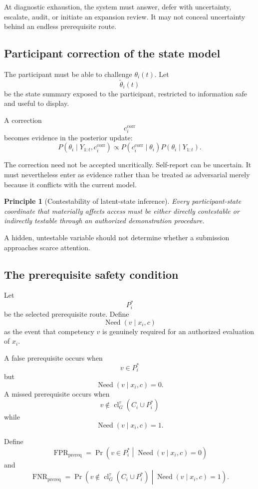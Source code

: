 \documentclass[11pt]{article}
\newtheorem{principle}[definition]{Principle}
\theoremstyle{definition}
\DeclareMathOperator{\Prob}{Pr}
\DeclareMathOperator{\closure}{cl}
\begin{document}
At diagnostic exhaustion, the system must answer, defer with uncertainty, escalate, audit, or initiate an expansion review. It may not conceal uncertainty behind an endless prerequisite route.

\subsection{Participant correction of the state model}

The participant must be able to challenge \(\theta_i(t)\). Let
\[
\widetilde\theta_i(t)
\]
be the state summary exposed to the participant, restricted to information safe and useful to display.

A correction
\[
c_i^{\mathrm{corr}}
\]
becomes evidence in the posterior update:
\[
P(\theta_i\mid Y_{1:t},c_i^{\mathrm{corr}})
\propto
P(c_i^{\mathrm{corr}}\mid\theta_i)
P(\theta_i\mid Y_{1:t}).
\]

The correction need not be accepted uncritically. Self-report can be uncertain. It must nevertheless enter as evidence rather than be treated as adversarial merely because it conflicts with the current model.

\begin{principle}[Contestability of latent-state inference]
Every participant-state coordinate that materially affects access must be either directly contestable or indirectly testable through an authorized demonstration procedure.
\end{principle}

A hidden, untestable variable should not determine whether a submission approaches scarce attention.

\subsection{The prerequisite safety condition}

Let
\[
P_i^{*}
\]
be the selected prerequisite route. Define
\[
\operatorname{Need}(v\mid x_i,c)
\]
as the event that competency \(v\) is genuinely required for an authorized evaluation of \(x_i\).

A false prerequisite occurs when
\[
v\in P_i^{*}
\]
but
\[
\operatorname{Need}(v\mid x_i,c)=0.
\]
A missed prerequisite occurs when
\[
v\notin
\closure_G^\tau(C_i\cup P_i^{*})
\]
while
\[
\operatorname{Need}(v\mid x_i,c)=1.
\]

Define
\[
\operatorname{FPR}_{\mathrm{prereq}}
=
\Prob
\left(
v\in P_i^{*}
\middle|
\operatorname{Need}(v\mid x_i,c)=0
\right)
\]
and
\[
\operatorname{FNR}_{\mathrm{prereq}}
=
\Prob
\left(
v\notin
\closure_G^\tau(C_i\cup P_i^{*})
\middle|
\operatorname{Need}(v\mid x_i,c)=1
\right).
\]
\end{document}
